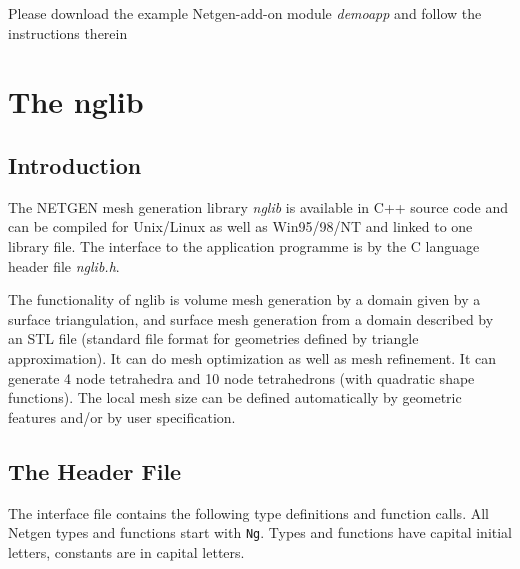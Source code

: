 \documentclass[12pt]{book}
\begin{document}
Please download the example Netgen-add-on module {\it demoapp} and
follow the instructions therein

\section{The nglib}


\subsection{Introduction}
The NETGEN mesh generation library {\it nglib} is available in C++
source code and can be compiled for Unix/Linux as well as Win95/98/NT
and linked to one library file. The interface to the application
programme is by the C language header file {\it nglib.h}.

The functionality of nglib is volume mesh generation by a domain given 
by a surface triangulation, and surface mesh generation from a domain 
described by an STL file (standard file format for geometries defined by
triangle approximation). It can do mesh optimization as well as mesh 
refinement. It can generate 4 node tetrahedra and 10 node tetrahedrons
(with quadratic shape functions). The local mesh size can be defined 
automatically by geometric features and/or by user specification.


\subsection{The Header File}

The interface file contains the following type definitions and function
calls. All Netgen types and functions start with {\tt Ng}. Types and
functions have capital initial letters, constants are in capital letters.
\end{document}
